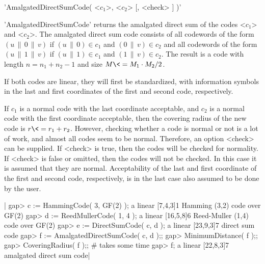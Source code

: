 

'AmalgatedDirectSumCode( <$c_1$>, <$c_2$> [, <check> ] )'

'AmalgatedDirectSumCode' returns the amalgated direct sum of the
codes <$c_1$> and <$c_2$>. 
The amalgated direct sum code consists of all codewords of the form
$(u \, \| \,0 \, \| \, v)$
if
$(u \, \| \, 0) \in c_1$
and
$(0 \, \| \, v) \in c_2$
and all codewords of the form
$(u \, \| \, 1 \, \| \, v)$
if
$(u \, \| \, 1) \in c_1$
and
$(1 \, \| \, v) \in c_2$.
The result is a code with length
$ n = n_1 + n_2 - 1 $
and size
$ M \<= M_1 \cdot M_2 / 2 $.

If both codes are linear, they will first be standardized, with
information symbols in the last and first coordinates of the
first and second code, respectively.

If $c_1$ is a normal code with the last coordinate acceptable,
and $c_2$ is a normal code with the first coordinate acceptable,
then the covering radius of the new code is
$ r \<= r_1 + r_2 $.
However, checking whether a code is normal or not is a lot of work,
and almost all codes seem to be normal.
Therefore, an option <check> can be supplied.
If <check> is true, then the codes will be checked for normality.
If <check> is false or omitted, then the codes will not be checked.
In this case it is assumed that they are normal.
Acceptability of the last and first coordinate of the first and second
code, respectively, is in the last case also assumed to be done by
the user.

|    gap> c := HammingCode( 3, GF(2) );
    a linear [7,4,3]1 Hamming (3,2) code over GF(2)
    gap> d := ReedMullerCode( 1, 4 );
    a linear [16,5,8]6 Reed-Muller (1,4) code over GF(2)
    gap> e := DirectSumCode( c, d );
    a linear [23,9,3]7 direct sum code
    gap> f := AmalgatedDirectSumCode( c, d );;
    gap> MinimumDistance( f );;
    gap> CoveringRadius( f );; # takes some time
    gap> f; 
    a linear [22,8,3]7 amalgated direct sum code|




